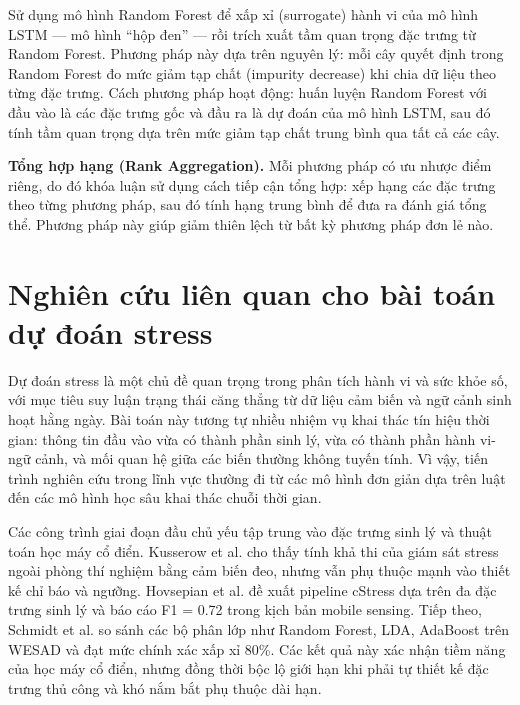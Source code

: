 Sử dụng mô hình Random Forest \cite{breiman2001random} để xấp xỉ (surrogate) hành vi của mô hình LSTM — mô hình ``hộp đen'' — rồi trích xuất tầm quan trọng đặc trưng từ Random Forest. Phương pháp này dựa trên nguyên lý: mỗi cây quyết định trong Random Forest đo mức giảm tạp chất (impurity decrease) khi chia dữ liệu theo từng đặc trưng. Cách phương pháp hoạt động: huấn luyện Random Forest với đầu vào là các đặc trưng gốc và đầu ra là dự đoán của mô hình LSTM, sau đó tính tầm quan trọng dựa trên mức giảm tạp chất trung bình qua tất cả các cây.

\textbf{Tổng hợp hạng (Rank Aggregation).} Mỗi phương pháp có ưu nhược điểm riêng, do đó khóa luận sử dụng cách tiếp cận tổng hợp: xếp hạng các đặc trưng theo từng phương pháp, sau đó tính hạng trung bình để đưa ra đánh giá tổng thể. Phương pháp này giúp giảm thiên lệch từ bất kỳ phương pháp đơn lẻ nào.


\section{Nghiên cứu liên quan cho bài toán dự đoán stress}
\label{sec:related_work}

Dự đoán stress là một chủ đề quan trọng trong phân tích hành vi và sức khỏe số, với mục tiêu suy luận trạng thái căng thẳng từ dữ liệu cảm biến và ngữ cảnh sinh hoạt hằng ngày. Bài toán này tương tự nhiều nhiệm vụ khai thác tín hiệu thời gian: thông tin đầu vào vừa có thành phần sinh lý, vừa có thành phần hành vi-ngữ cảnh, và mối quan hệ giữa các biến thường không tuyến tính. Vì vậy, tiến trình nghiên cứu trong lĩnh vực thường đi từ các mô hình đơn giản dựa trên luật đến các mô hình học sâu khai thác chuỗi thời gian.

Các công trình giai đoạn đầu chủ yếu tập trung vào đặc trưng sinh lý và thuật toán học máy cổ điển. Kusserow et al. \cite{kusserow2013monitoring} cho thấy tính khả thi của giám sát stress ngoài phòng thí nghiệm bằng cảm biến đeo, nhưng vẫn phụ thuộc mạnh vào thiết kế chỉ báo và ngưỡng. Hovsepian et al. \cite{hovsepian2015cstress} đề xuất pipeline cStress dựa trên đa đặc trưng sinh lý và báo cáo F1 = 0.72 trong kịch bản mobile sensing. Tiếp theo, Schmidt et al. \cite{schmidt2018wesad} so sánh các bộ phân lớp như Random Forest, LDA, AdaBoost trên WESAD và đạt mức chính xác xấp xỉ 80\%. Các kết quả này xác nhận tiềm năng của học máy cổ điển, nhưng đồng thời bộc lộ giới hạn khi phải tự thiết kế đặc trưng thủ công và khó nắm bắt phụ thuộc dài hạn.


